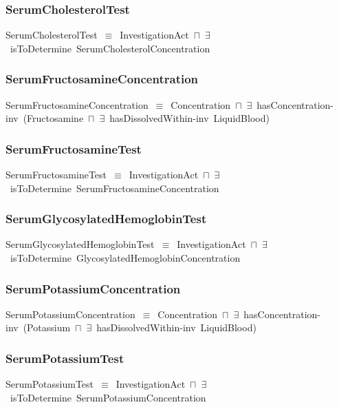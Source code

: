 \documentclass{article}
\begin{document}
\subsubsection*{SerumCholesterolTest}

SerumCholesterolTest~\ensuremath{\equiv}~InvestigationAct~\ensuremath{\sqcap}~\ensuremath{\exists}~isToDetermine~SerumCholesterolConcentration

\subsubsection*{SerumFructosamineConcentration}

SerumFructosamineConcentration~\ensuremath{\equiv}~Concentration~\ensuremath{\sqcap}~\ensuremath{\exists}~hasConcentration-inv~(Fructosamine~\ensuremath{\sqcap}~\ensuremath{\exists}~hasDissolvedWithin-inv~LiquidBlood)

\subsubsection*{SerumFructosamineTest}

SerumFructosamineTest~\ensuremath{\equiv}~InvestigationAct~\ensuremath{\sqcap}~\ensuremath{\exists}~isToDetermine~SerumFructosamineConcentration

\subsubsection*{SerumGlycosylatedHemoglobinTest}

SerumGlycosylatedHemoglobinTest~\ensuremath{\equiv}~InvestigationAct~\ensuremath{\sqcap}~\ensuremath{\exists}~isToDetermine~GlycosylatedHemoglobinConcentration

\subsubsection*{SerumPotassiumConcentration}

SerumPotassiumConcentration~\ensuremath{\equiv}~Concentration~\ensuremath{\sqcap}~\ensuremath{\exists}~hasConcentration-inv~(Potassium~\ensuremath{\sqcap}~\ensuremath{\exists}~hasDissolvedWithin-inv~LiquidBlood)

\subsubsection*{SerumPotassiumTest}

SerumPotassiumTest~\ensuremath{\equiv}~InvestigationAct~\ensuremath{\sqcap}~\ensuremath{\exists}~isToDetermine~SerumPotassiumConcentration
\end{document}
